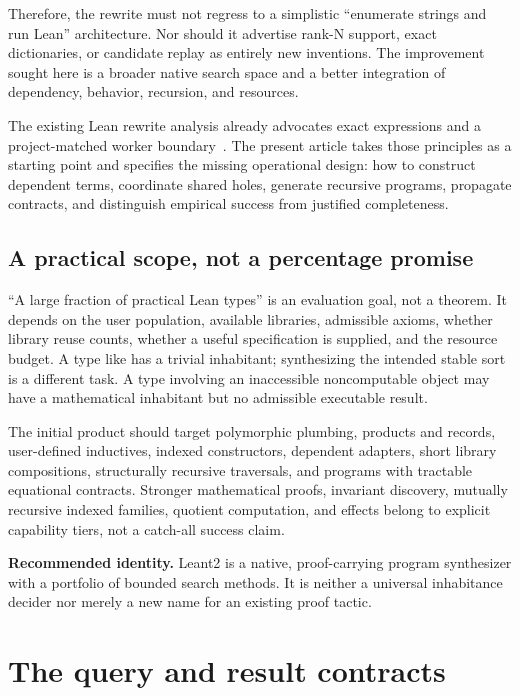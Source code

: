 Therefore, the rewrite must not regress to a simplistic ``enumerate strings and run Lean'' architecture. Nor should it advertise rank-N support, exact dictionaries, or candidate replay as entirely new inventions. The improvement sought here is a broader native search space and a better integration of dependency, behavior, recursion, and resources.

The existing Lean rewrite analysis already advocates exact expressions and a project-matched worker boundary~\cite{rewrite}. The present article takes those principles as a starting point and specifies the missing operational design: how to construct dependent terms, coordinate shared holes, generate recursive programs, propagate contracts, and distinguish empirical success from justified completeness.

\subsection{A practical scope, not a percentage promise}
``A large fraction of practical Lean types'' is an evaluation goal, not a theorem. It depends on the user population, available libraries, admissible axioms, whether library reuse counts, whether a useful specification is supplied, and the resource budget. A type like  has a trivial inhabitant; synthesizing the intended stable sort is a different task. A type involving an inaccessible noncomputable object may have a mathematical inhabitant but no admissible executable result.

The initial product should target polymorphic plumbing, products and records, user-defined inductives, indexed constructors, dependent adapters, short library compositions, structurally recursive traversals, and programs with tractable equational contracts. Stronger mathematical proofs, invariant discovery, mutually recursive indexed families, quotient computation, and effects belong to explicit capability tiers, not a catch-all success claim.

\begin{designbox}
\textbf{Recommended identity.} Leant2 is a native, proof-carrying program synthesizer with a portfolio of bounded search methods. It is neither a universal inhabitance decider nor merely a new name for an existing proof tactic.
\end{designbox}

\section{The query and result contracts}
\label{sec:query}

